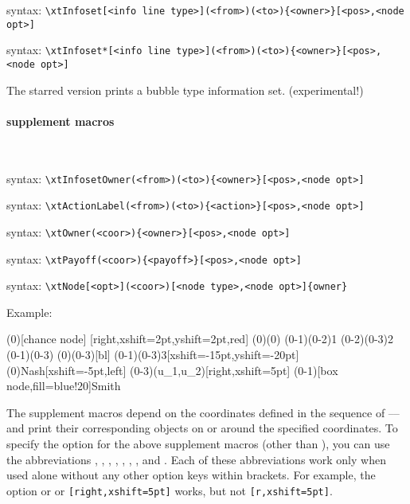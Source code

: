 syntax: \verb|\xtInfoset[<info line type>](<from>)(<to>){<owner>}[<pos>,<node opt>]|

syntax: \verb|\xtInfoset*[<info line type>](<from>)(<to>){<owner>}[<pos>,<node opt>]|

\quad The starred version \cmd{\xtInfoset*} prints a bubble type information set. (experimental!)

\paragraph{supplement macros} ~

syntax: \verb|\xtInfosetOwner(<from>)(<to>){<owner>}[<pos>,<node opt>]|

syntax: \verb|\xtActionLabel(<from>)(<to>){<action>}[<pos>,<node opt>]|

syntax: \verb|\xtOwner(<coor>){<owner>}[<pos>,<node opt>]|

syntax: \verb|\xtPayoff(<coor>){<payoff>}[<pos>,<node opt>]|

syntax: \verb|\xtNode[<opt>](<coor>)[<node type>,<node opt>]{owner}|

Example:

\begin{tcblisting}{}
\begin{istgame}[scale=1.5]
\istroot(0)[chance node]
  \istb*
  [right,xshift=2pt,yshift=2pt,red]
\endist
\xtInfoset*(0)(0)
\xtInfoset[thick](0-1)(0-2){1}
(0-2)(0-3){2}
\xtInfoset[dashed,out=-30,in=210](0-1)(0-3)
\xtActionLabel(0)(0-3){\epsilon}[bl] %
\xtInfosetOwner(0-1)(0-3){3}[xshift=-15pt,yshift=-20pt]
\xtOwner(0){Nash}[xshift=-5pt,left]
\xtPayoff(0-3){(u_1,u_2)}[right,xshift=5pt] %
\xtNode[dotted](0-1)[box node,fill=blue!20]{Smith}
\end{istgame}
\end{tcblisting}

The supplement macros depend on the coordinates defined in the sequence of \cmd{\istroot}--\cmd{\istb}--\cmd{\endist} and print their corresponding objects on or around the specified coordinates.
To specify the \xword{[<pos>]} option for the above supplement macros (other than \cmd{\xtNode}), 
you can use the abbreviations 
\xword{[l]}, \xword{[r]}, \xword{[a]}, \xword{[b]}, \xword{[al]}, \xword{[ar]}, \xword{[bl]}, and \xword{[br]}.
Each of these abbreviations work only when used alone without any other option keys within brackets.
For example, the option \xword{[r]} or \xword{[right]} or \verb+[right,xshift=5pt]+ works, but not \verb+[r,xshift=5pt]+.

